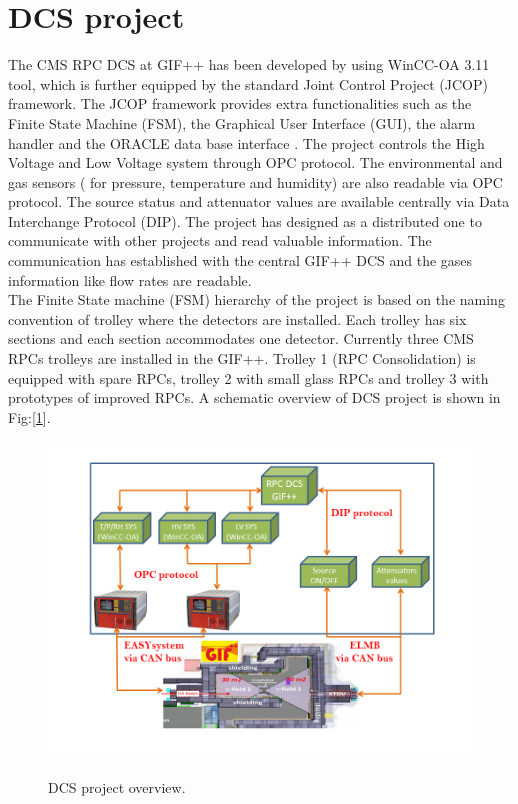 \documentclass[a4paper,11pt]{article}
\begin{document}
\section{DCS project}
The CMS RPC DCS at GIF++ has been developed by using WinCC-OA 3.11 tool, which is further equipped by the standard Joint Control Project (JCOP) framework. The JCOP framework provides extra functionalities such as the Finite State Machine (FSM), the Graphical User Interface (GUI), the alarm handler and the ORACLE data base interface \cite{g-polese}. The project controls the High Voltage and Low Voltage system through OPC protocol. The environmental and gas sensors ( for pressure, temperature and humidity) are also readable via OPC protocol. The source status and attenuator values are available centrally via Data Interchange Protocol (DIP). The project has designed as a distributed one to communicate with other projects and read valuable information. The communication has established with the central GIF++ DCS and the gases information like flow rates are readable.\\
The Finite State machine (FSM) hierarchy of the project is based on the naming convention of trolley where the detectors are installed. Each trolley has six sections and each section accommodates one detector. Currently three CMS RPCs trolleys are installed in the GIF++. Trolley 1 (RPC Consolidation) is equipped with spare RPCs, trolley 2 with small glass RPCs and trolley 3 with prototypes of improved RPCs. 
A schematic overview of DCS project is shown in Fig:[\ref{DCS_sys}]. 

\begin{figure}[htp]
\centering
\hspace{-0.5cm}
\includegraphics[scale=0.5,trim=60 30 60 30,clip]{images/DCS_sys.png}\\
 \caption{DCS project overview.}
\label{DCS_sys}
\end{figure}
\end{document}
